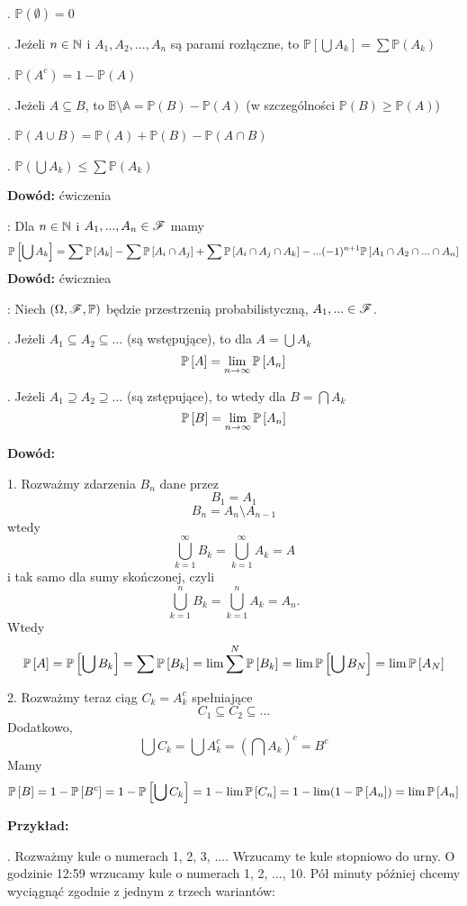 . $\mathbb{P}(\emptyset)=0$

. Jeżeli $n\in\mathbb{N}$ i $A_1, A_2,...,A_n$ są parami rozłączne, to $\mathbb{P}[\bigcup A_k]=\sum\mathbb{P}(A_k)$

. $\mathbb{P}(A^c)=1-\mathbb{P}(A)$

. Jeżeli $A\subseteq B$, to $\mathbb{B\setminus A}=\mathbb{P}(B)-\mathbb{P}(A)$ (w szczególności $\mathbb{P}(B)\geq\mathbb{P}(A)$)

. $\mathbb{P}(A\cup B)=\mathbb{P}(A)+\mathbb{P}(B)-\mathbb{P}(A\cap B)$

. $\mathbb{P}(\bigcup A_k)\leq\sum\mathbb{P}(A_k)$

\textbf{Dowód:} ćwiczenia \proofend
\medskip

: Dla $n\in \mathbb{N}$ i $A_1,...,A_n\in\mathcal{F}$ mamy
$$\mathbb{P}\left[\bigcup A_k\right]=\sum\mathbb{P}\left[A_k\right]-\sum\mathbb{P}\left[A_i\cap A_j\right]+\sum\mathbb{P}\left[A_i\cap A_j\cap A_k\right]-...(-1)^{n+1}\mathbb{P}\left[A_1\cap A_2\cap ...\cap A_n\right]$$
\textbf{Dowód:} ćwiczniea \proofend
\medskip

: Niech $(\Omega,\mathcal{F},\mathbb{P})$ będzie przestrzenią probabilistyczną, $A_1,...\in\mathcal{F}$. 

. Jeżeli $A_1\subseteq A_2\subseteq...$ (są wstępujące), to dla $A=\bigcup A_k$
$$\mathbb{P}\left[A\right]=\lim_{n\to\infty}\mathbb{P}\left[A_n\right]$$

. Jeżeli $A_1\supseteq A_2\supseteq...$ (są zstępujące), to wtedy dla $B=\bigcap A_k$
$$\mathbb{P}\left[B\right]=\lim_{n\to\infty}\mathbb{P}\left[A_n\right]$$

\textbf{Dowód:} 

1. Rozważmy zdarzenia $B_n$ dane przez
$$B_1=A_1$$
$$B_n=A_n\setminus A_{n-1}$$
wtedy 
$$\bigcup\limits_{k=1}^\infty B_k=\bigcup\limits_{k=1}^\infty A_k=A$$
i tak samo dla sumy skończonej, czyli
$$\bigcup\limits_{k=1}^n B_k=\bigcup\limits_{k=1}^n A_k=A_n.$$
Wtedy
$$\mathbb{P}\left[A\right]=\mathbb{P}\left[\bigcup B_k\right]=\sum\mathbb{P}\left[B_k\right]=\lim\sum^N\mathbb{P}\left[B_k\right]=\lim\mathbb{P}\left[\bigcup B_N\right]=\lim\mathbb{P}\left[A_N\right]$$

2. Rozważmy teraz ciąg $C_k=A_k^c$ spełniające
$$C_1\subseteq C_2\subseteq ...$$
Dodatkowo,
$$\bigcup C_k=\bigcup A_k^c=\left(\bigcap A_k\right)^c=B^c$$
Mamy
$$\mathbb{P}\left[B\right]=1-\mathbb{P}\left[B^c\right]=1-\mathbb{P}\left[\bigcup C_k\right]=1-\lim\mathbb{P}\left[C_n\right]=1-\lim(1-\mathbb{P}\left[A_n\right])=\lim\mathbb{P}\left[A_n\right]$$

\proofend
\medskip

\textbf{\large Przykład:}

. Rozważmy kule o numerach 1, 2, 3, .... Wrzucamy te kule stopniowo do urny. O godzinie 12:59 wrzucamy kule o numerach 1, 2, ..., 10. Pół minuty później chcemy wyciągnąć zgodnie z jednym z trzech wariantów:

